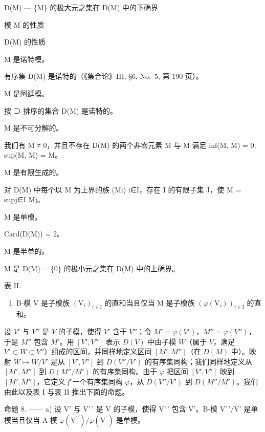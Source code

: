 D(M) --- \{M\} 的极大元之集在 D(M) 中的下确界

模 M 的性质

D(M) 的性质

M 是诺特模。

有序集 D(M) 是诺特的（《集合论》III, §6, No.~5, 第 190 页）。

M 是阿廷模。

按 ⊃ 排序的集合 D(M) 是诺特的。

M 是不可分解的。

我们有 M ≠ 0，并且不存在 D(M) 的两个非零元素 M\textquotesingle{} 与 M\textquotesingle\textquotesingle{} 满足 inf(M\textquotesingle, M\textquotesingle\textquotesingle) = 0, sup(M\textquotesingle, M\textquotesingle\textquotesingle) = M。

M 是有限生成的。

对 D(M) 中每个以 M 为上界的族 (Mi) i∈I，存在 I 的有限子集 J，使 M = supj∈I Mj。

M 是单模。

Card(D(M)) = 2。

M 是半单的。

M 是 D(M) = \{0\} 的极小元之集在 D(M) 中的上确界。

表 II.

\begin{enumerate}
\def\labelenumi{\alph{enumi})}
\setcounter{enumi}{2}
\tightlist
\item
  B-模 V 是子模族 \((\mathrm{V}_{i})_{i\in\mathrm{I}}\) 的直和当且仅当 M 是子模族 \((\varphi(\mathrm{V}_{i}))_{i\in\mathrm{I}}\) 的直和。
\end{enumerate}

设 \(V'\) 与 \(V''\) 是 \(V\) 的子模，使得 \(V'\) 含于 \(V''\)；令 \(M' = \varphi(V')\)，\(M'' = \varphi(V'')\)，于是 \(M''\) 包含 \(M'\)。用 \([V', V'']\) 表示 \(D(V)\) 中由子模 \(W\)（属于 \(V\)，满足 \(V' \subset W \subset V''\)）组成的区间，并同样地定义区间 \([M', M'']\)（在 \(D(M)\) 中）。映射 \(W \mapsto W/V'\) 是从 \([V', V'']\) 到 \(D(V''/V')\) 的有序集同构；我们同样地定义从 \([M', M'']\) 到 \(D(M''/M')\) 的有序集同构。由于 \(\varphi\) 把区间 \([V', V'']\) 映到 \([M', M'']\)，它定义了一个有序集同构 \(\varphi\)，从 \(D(V''/V')\) 到 \(D(M''/M')\)。我们由此以及表 I 与表 II 推出下面的命题。

命题 8. —— a) 设 V' 与 V'\,' 是 V 的子模，使得 V'\,' 包含 V'。B-模 V'\,'/V' 是单模当且仅当 A-模 \(\varphi(\mathrm{V}^{\prime\prime})/\varphi(\mathrm{V}^{\prime})\) 是单模。


